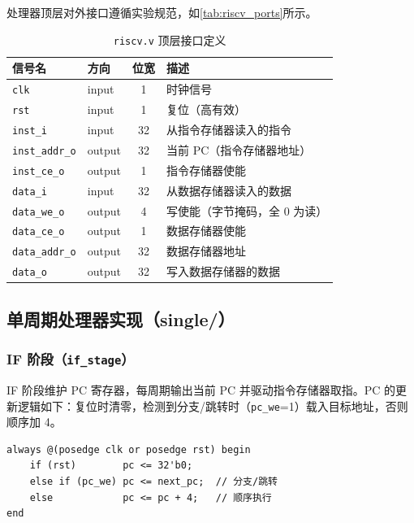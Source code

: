 \documentclass[12pt,hyperref,a4paper,UTF8]{ctexart}
\begin{document}
处理器顶层对外接口遵循实验规范，如\autoref{tab:riscv_ports}所示。

\begin{table}[H]
    \centering
    \caption{\texttt{riscv.v} 顶层接口定义}
    \label{tab:riscv_ports}
    \begin{tabular}{llcl}
        \toprule
        信号名 & 方向 & 位宽 & 描述 \\
        \midrule
        \texttt{clk}          & input  & 1  & 时钟信号 \\
        \texttt{rst}          & input  & 1  & 复位（高有效） \\
        \texttt{inst\_i}      & input  & 32 & 从指令存储器读入的指令 \\
        \texttt{inst\_addr\_o}& output & 32 & 当前 PC（指令存储器地址） \\
        \texttt{inst\_ce\_o}  & output & 1  & 指令存储器使能 \\
        \texttt{data\_i}      & input  & 32 & 从数据存储器读入的数据 \\
        \texttt{data\_we\_o}  & output & 4  & 写使能（字节掩码，全 0 为读） \\
        \texttt{data\_ce\_o}  & output & 1  & 数据存储器使能 \\
        \texttt{data\_addr\_o}& output & 32 & 数据存储器地址 \\
        \texttt{data\_o}      & output & 32 & 写入数据存储器的数据 \\
        \bottomrule
    \end{tabular}
\end{table}

\subsection{单周期处理器实现（single/）}

\subsubsection{IF 阶段（\texttt{if\_stage}）}

IF 阶段维护 PC 寄存器，每周期输出当前 PC 并驱动指令存储器取指。PC 的更新逻辑如下：复位时清零，检测到分支/跳转时（\texttt{pc\_we}=1）载入目标地址，否则顺序加 4。

\begin{lstlisting}[caption={if\_stage PC 更新逻辑}]
always @(posedge clk or posedge rst) begin
    if (rst)        pc <= 32'b0;
    else if (pc_we) pc <= next_pc;  // 分支/跳转
    else            pc <= pc + 4;   // 顺序执行
end
\end{lstlisting}
\end{document}
